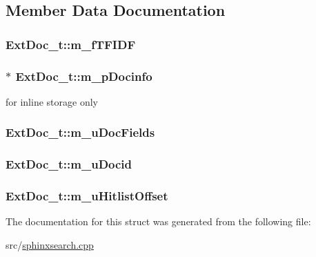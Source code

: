 \subsection{Member Data Documentation}
\hypertarget{structExtDoc__t_ace1dc0e60d48c5bfcaecfdb8107aa7d9}{
\subsubsection[{m\-\_\-f\-T\-F\-I\-D\-F}]{ Ext\-Doc\-\_\-t\-::m\-\_\-f\-T\-F\-I\-D\-F}}\label{structExtDoc__t_ace1dc0e60d48c5bfcaecfdb8107aa7d9}
\hypertarget{structExtDoc__t_ad24d315e3e0396613fe4a7b538cd03b0}{
\subsubsection[{m\-\_\-p\-Docinfo}]{$\ast$ Ext\-Doc\-\_\-t\-::m\-\_\-p\-Docinfo}}\label{structExtDoc__t_ad24d315e3e0396613fe4a7b538cd03b0}


for inline storage only 

\hypertarget{structExtDoc__t_a60f8d0e41e4f1ee13391ac1ccd725356}{
\subsubsection[{m\-\_\-u\-Doc\-Fields}]{ Ext\-Doc\-\_\-t\-::m\-\_\-u\-Doc\-Fields}}\label{structExtDoc__t_a60f8d0e41e4f1ee13391ac1ccd725356}
\hypertarget{structExtDoc__t_a069be250ee7f6b3c8c7444d5e0f6131f}{
\subsubsection[{m\-\_\-u\-Docid}]{ Ext\-Doc\-\_\-t\-::m\-\_\-u\-Docid}}\label{structExtDoc__t_a069be250ee7f6b3c8c7444d5e0f6131f}
\hypertarget{structExtDoc__t_a4306341b6dcc6bf4e9ae8f9db211723b}{
\subsubsection[{m\-\_\-u\-Hitlist\-Offset}]{ Ext\-Doc\-\_\-t\-::m\-\_\-u\-Hitlist\-Offset}}\label{structExtDoc__t_a4306341b6dcc6bf4e9ae8f9db211723b}


The documentation for this struct was generated from the following file\-:\begin{DoxyCompactItemize}
\item 
src/\hyperlink{sphinxsearch_8cpp}{sphinxsearch.\-cpp}\end{DoxyCompactItemize}
